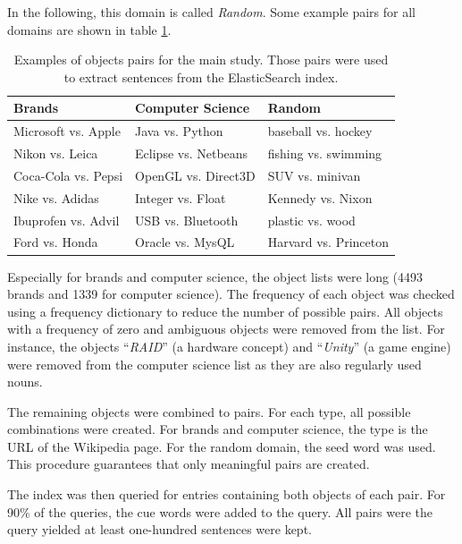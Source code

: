 In the following, this domain is called \emph{Random}. Some example pairs for all domains are shown in table \ref{tbl:exp_pairs}.
\begin{table}[h]
\centering
\caption{Examples of objects pairs for the main study. Those pairs were used to extract sentences from the ElasticSearch index.}
\label{tbl:exp_pairs}

\begin{tabularx}{\textwidth}{XXX}
\toprule
Brands & Computer Science & Random \\
\midrule
Microsoft vs. Apple & Java vs. Python & baseball vs. hockey \\
Nikon vs. Leica & Eclipse vs. Netbeans & fishing vs. swimming\\
Coca-Cola vs. Pepsi & OpenGL vs. Direct3D & SUV vs. minivan\\
Nike vs. Adidas & Integer vs. Float & Kennedy vs. Nixon\\
Ibuprofen vs. Advil & USB vs. Bluetooth & plastic vs. wood\\
Ford vs. Honda & Oracle vs. MysQL & Harvard vs. Princeton\\

\bottomrule

\end{tabularx}

\end{table}

Especially for brands and computer science, the object lists were long (4493 brands and 1339 for computer science). The frequency of each object was checked using a frequency dictionary to reduce the number of possible pairs. All objects with a frequency of zero and ambiguous objects were removed from the list. For instance, the objects \enquote{\emph{RAID}} (a hardware concept) and \enquote{\emph{Unity}}  (a game engine) were removed from the computer science list as they are also regularly used nouns.

The remaining objects were combined to pairs. For each type, all possible combinations were created. For brands and computer science, the type is the URL of the Wikipedia page. For the random domain, the seed word was used. This procedure guarantees that only meaningful pairs are created.




The index was then queried for entries containing both objects of each pair. For 90\% of the queries, the cue words were added to the query. All pairs were the query yielded at least one-hundred sentences were kept.

